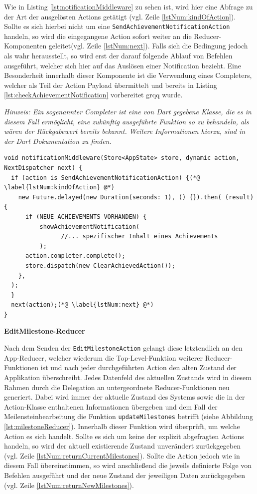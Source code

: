 \documentclass[bibliography=totoc,listof=totoc,BCOR=5mm,DIV=12,oneside]{scrbook}
\begin{document}
\newpage
\par Wie in Listing \ref{lst:notificationMiddleware} zu sehen ist, wird hier eine Abfrage zu der Art der ausgelösten Actions getätigt (vgl. Zeile \ref{lstNum:kindOfAction}). Sollte es sich hierbei nicht um eine \texttt{SendAchievementNotificationAction} handeln, so wird die eingegangene Action sofort weiter an die Reducer-Komponenten geleitet(vgl. Zeile \ref{lstNum:next}). Falls sich die Bedingung jedoch als wahr herausstellt, so wird erst der darauf folgende Ablauf von Befehlen ausgeführt, welcher sich hier auf das Auslösen einer Notification bezieht. Eine Besonderheit innerhalb dieser Komponente ist die Verwendung eines Completers, welcher als Teil der Action Payload übermittelt und bereits in Listing \ref{lst:checkAchievementNotification} \grqq vorbereitet grqq{} wurde.

\par \bigskip \textit{Hinweis: Ein sogenannter Completer ist eine von Dart gegebene Klasse, die es in diesem Fall ermöglicht, eine zukünftig ausgeführte Funktion so zu behandeln, als wären der Rückgabewert bereits bekannt. Weitere Informationen hierzu, sind in der Dart Dokumentation zu finden.} \citep{DartCompleter}

\bigskip
\begin{lstlisting}[caption={Notification Middleware},captionpos=b, label=lst:notificationMiddleware]
void notificationMiddleware(Store<AppState> store, dynamic action, NextDispatcher next) { 
  if (action is SendAchievementNotificationAction) {(*@ \label{lstNum:kindOfAction} @*)
  	new Future.delayed(new Duration(seconds: 1), () {}).then( (result) {
      if (NEUE ACHIEVEMENTS VORHANDEN) {
          showAchievementNotification(
				//... spezifischer Inhalt eines Achievements       
          );
      action.completer.complete();
      store.dispatch(new ClearAchievedAction());
    },
  );
  }
  next(action);(*@ \label{lstNum:next} @*)
}
\end{lstlisting}
\bigskip

\par \textbf{EditMilestone-Reducer}
\par Nach dem Senden der \texttt{EditMilestoneAction} gelangt diese letztendlich an den App-Reducer, welcher wiederum die Top-Level-Funktion weiterer Reducer-Funktionen ist und nach jeder durchgeführten Action den alten Zustand der Applikation überschreibt. Jedes Datenfeld des aktuellen Zustands wird in diesem Rahmen durch die Delegation an untergeordnete Reducer-Funktionen neu generiert. Dabei wird immer der aktuelle Zustand des Systems sowie die in der Action-Klasse enthaltenen Informationen übergeben und dem Fall der Meilensteinbearbeitung die Funktion \texttt{updateMilestones} betrifft (siehe Abbildung \ref{lst:milestoneReducer}). Innerhalb dieser Funktion wird überprüft, um welche Action es sich handelt. Sollte es sich um keine der explizit abgefragten Actions handeln, so wird der aktuell existierende Zustand unverändert zurückgegeben (vgl. Zeile \ref{lstNum:returnCurrentMilestones}). Sollte die Action jedoch wie in diesem Fall übereinstimmen, so wird anschließend die jeweils definierte Folge von Befehlen ausgeführt und der neue Zustand der jeweiligen Daten zurückgegeben (vgl. Zeile \ref{lstNum:returnNewMilestones}).
\end{document}
